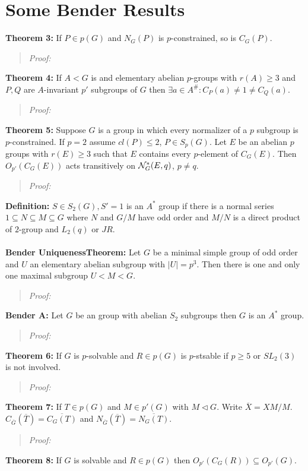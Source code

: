 \section{Some Bender Results}
{\bf Theorem 3:} If $P \in p(G)$ and $N_G(P)$ is $p$-constrained, so is $C_G(P)$.
\begin{quote}
\emph{Proof:}
\end{quote}
{\bf Theorem 4:} If $A < G$ is and elementary abelian $p$-groups with $r(A) \geq 3$ and $P, Q $ are
$A$-invariant $p'$ subgroups of $G$ then $\exists a \in A^{\#}: C_P(a) \ne 1 \ne C_Q(a)$.
\begin{quote}
\emph{Proof:}
\end{quote}
{\bf Theorem 5:} Suppose $G$ is a group in which every normalizer of a $p$ subgroup is $p$-constrained.
If $p=2$ assume $cl(P) \leq 2$, $P \in S_p(G)$.  Let $E$ be an abelian $p$ groups with $r(E) \geq 3$ such that
$E$ contains every $p$-element of $C_G(E)$.  Then $O_{p'}(C_G(E))$ acts transitively on ${\cal N}_G^*(E,q)$,
$p \ne q$.
\begin{quote}
\emph{Proof:}
\end{quote}
{\bf Definition:} $S \in S_2(G), S' = 1$ is an $A^*$ group if there is a normal series 
$1 \subseteq N \subseteq M \subseteq G$ where $N$ and $G/M$ have odd order and $M/N$
is a direct product of $2$-group and $L_2(q)$ or $JR$.
\\
\\
{\bf Bender UniquenessTheorem:} Let $G$ be a minimal simple group of odd order and $U$ an elementary
abelian subgroup with $|U|=p^3$.   Then there is one and only one maximal subgroup $U<M<G$.
\begin{quote}
\emph{Proof:}
\end{quote}
{\bf Bender A:} Let $G$ be an group with abelian $S_2$ subgroups then $G$ is an $A^*$ group.
\begin{quote}
\emph{Proof:}
\end{quote}
{\bf Theorem 6:} If $G$ is $p$-solvable and $R \in p(G)$ is $p$-stsable if $p \geq 5$ or $SL_2(3)$ is not involved.
\begin{quote}
\emph{Proof:}
\end{quote}
{\bf Theorem 7:} If $T \in p(G)$ and $M \in p'(G)$ with $M \lhd G$.  Write ${\overline X} = XM/M$.
$C_{\overline G}({\overline T}) = {\overline {C_G(T)}}$ and
$N_{\overline G}({\overline T}) = {\overline {N_G(T)}}$.
\begin{quote}
\emph{Proof:}
\end{quote}
{\bf Theorem 8:} If $G$ is solvable and $R \in p(G)$ then $O_{p'}(C_G(R)) \subseteq O_{p'}(G)$.
